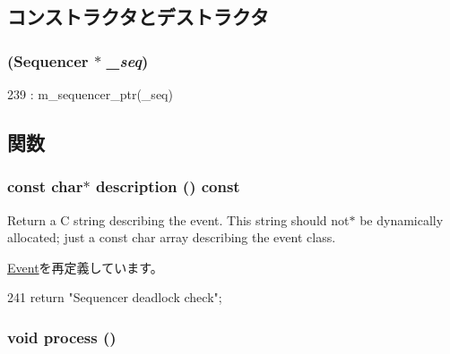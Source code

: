 \subsection{コンストラクタとデストラクタ}
\hypertarget{classSequencer_1_1SequencerWakeupEvent_afea1c2d8450af8d50f29d6c1158157ba}{
\subsubsection[{SequencerWakeupEvent}]{ ({\bf Sequencer} $\ast$ {\em \_\-seq})}}
\label{classSequencer_1_1SequencerWakeupEvent_afea1c2d8450af8d50f29d6c1158157ba}



\begin{DoxyCode}
239 : m_sequencer_ptr(_seq) {}
\end{DoxyCode}


\subsection{関数}
\hypertarget{classSequencer_1_1SequencerWakeupEvent_a2bd90422eece9190794479e08092a252}{
\subsubsection[{description}]{\setlength{\rightskip}{0pt plus 5cm}const char$\ast$ description () const}}
\label{classSequencer_1_1SequencerWakeupEvent_a2bd90422eece9190794479e08092a252}
Return a C string describing the event. This string should not$\ast$ be dynamically allocated; just a const char array describing the event class. 

\hyperlink{classEvent_a130ddddf003422b413e2e891b1b80e8f}{Event}を再定義しています。


\begin{DoxyCode}
241 { return "Sequencer deadlock check"; }
\end{DoxyCode}
\hypertarget{classSequencer_1_1SequencerWakeupEvent_a2e9c5136d19b1a95fc427e0852deab5c}{
\subsubsection[{process}]{\setlength{\rightskip}{0pt plus 5cm}void process ()}}
\label{classSequencer_1_1SequencerWakeupEvent_a2e9c5136d19b1a95fc427e0852deab5c}


